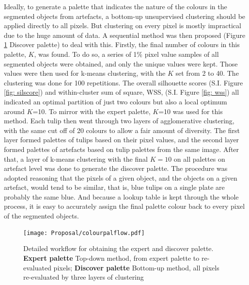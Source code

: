 \documentclass[11pt]{article}
\begin{document}
Ideally, to generate a palette that indicates the nature of the colours in the segmented objects from artefacts, a bottom-up unsupervised clustering should be applied directly to all pixels. But clustering on every pixel is mostly impractical due to the huge amount of data. A sequential method was then proposed (Figure \ref{fig: colpalflow} Discover palette) to deal with this. Firstly, the final number of colours in this palette, $K$, was found. To do so, a series of 1\% pixel value samples of all segmented objects were obtained, and only the unique values were kept. Those values were then used for k-means clustering, with the $K$ set from 2 to 40. The clustering was done for 100 repetitions. The overall silhouette scores (S.I. Figure \ref{fig: silscore}) and within-cluster sum of square, WSS, (S.I. Figure \ref{fig: wss}) all indicated an optimal partition of just two colours but also a local optimum around $K$=10. To mirror with the expert palette, $K$=10 was used for this method. Each tulip then went through two layers of agglomerative clustering, with the same cut off of 20 colours to allow a fair amount of diversity. The first layer formed palettes of tulips based on their pixel values, and the second layer formed palettes of artefacts based on tulip palettes from the same image. After that, a layer of k-means clustering with the final $K=10$ on all palettes on artefact level was done to generate the discover palette. The procedure was adopted reasoning that the pixels of a given object, and the objects on a given artefact, would tend to be similar, that is, blue tulips on a single plate are probably the same blue. And because a lookup table is kept through the whole process, it is easy to accurately assign the final palette colour back to every pixel of the segmented objects.\par

\begin{figure}[H]
\centering
\texttt{[image: Proposal/colourpalflow.pdf]}
\caption{Detailed workflow for obtaining the expert and discover palette. \textbf{Expert palette} Top-down method, from expert palette to re-evaluated pixels; \textbf{Discover palette} Bottom-up method, all pixels re-evaluated by three layers of clustering}
\label{fig: colpalflow}
\end{figure}
\end{document}
